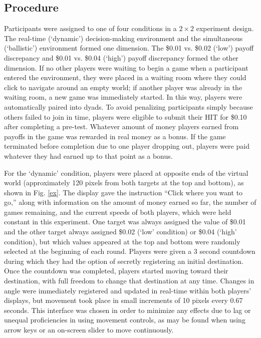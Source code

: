 \documentclass[10pt,letterpaper]{article}
\begin{document}
\subsection*{Procedure}
Participants were assigned to one of four conditions in a $2\times 2$ experiment design. The real-time (`dynamic') decision-making environment and the simultaneous (`ballistic') environment formed one dimension. The \$0.01 vs. \$0.02 (`low') payoff discrepancy and \$0.01 vs. \$0.04 (`high') payoff discrepancy formed the other dimension. If no other players were waiting to begin a game when a participant entered the environment, they were placed in a waiting room where they could click to navigate around an empty world; if another player was already in the waiting room, a new game was immediately started. In this way, players were automatically paired into dyads. To avoid penalizing participants simply because others failed to join in time, players were eligible to submit their HIT for \$0.10 after completing a pre-test. Whatever amount of money players earned from payoffs in the game was rewarded in real money as a bonus. If the game terminated before completion due to one player dropping out, players were paid whatever they had earned up to that point as a bonus.

For the `dynamic' condition, players were placed at opposite ends of the virtual world (approximately 120 pixels from both targets at the top and bottom), as shown in Fig. \ref{ex}. The display gave the instruction ``Click where you want to go,'' along with information on the amount of money earned so far, the number of games remaining, and the current speeds of both players, which were held constant in this experiment. One target was always assigned the value of \$0.01 and the other target always assigned \$0.02 (`low' condition) or \$0.04 (`high' condition), but which values appeared at the top and bottom were randomly selected at the beginning of each round. Players were given a 3 second countdown during which they had the option of secretly registering an initial destination. Once the countdown was completed, players started moving toward their destination, with full freedom to change that destination at any time. Changes in angle were immediately registered and updated in real-time within both players' displays, but movement took place in small increments of 10 pixels every 0.67 seconds. This interface was chosen in order to minimize any effects due to lag or unequal proficiencies in using movement controls, as may be found when using arrow keys or an on-screen slider to move continuously. 
\end{document}
